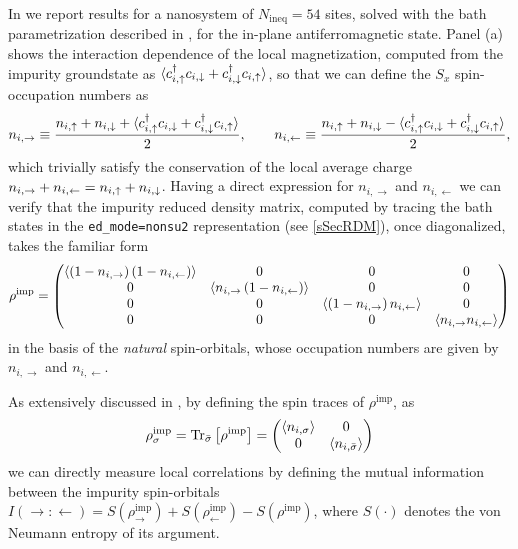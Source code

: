 \documentclass[edipack_sp.tex]{subfiles}
\begin{document}
In  we report results for a nanosystem of 
$N_\mathrm{ineq}=54$ sites, solved with the bath parametrization 
described in , for the in-plane 
antiferromagnetic state.
Panel (a) shows the interaction dependence of the local magnetization,
computed from the impurity groundstate as  
$ \langle c^\dagger_{i,\uparrow} c_{i,\downarrow} + c^\dagger_{i,\downarrow} c_{i,\uparrow} \rangle$,
so that we can define the $S_x$ spin-occupation numbers as
\begin{equation*}
    n_{i,\rightarrow} \equiv \frac{n_{i,\uparrow} + n_{i,\downarrow} +
    \langle c^\dagger_{i,\uparrow} c_{i,\downarrow} + c^\dagger_{i,\downarrow} c_{i,\uparrow} \rangle}{2},
    \qquad
    n_{i,\leftarrow} \equiv \frac{n_{i,\uparrow} + n_{i,\downarrow} -
    \langle c^\dagger_{i,\uparrow} c_{i,\downarrow} + c^\dagger_{i,\downarrow} c_{i,\uparrow} \rangle}{2},
\end{equation*}
which trivially satisfy the conservation of the local average charge $n_{i,\rightarrow} + n_{i,\leftarrow} = n_{i,\uparrow} + n_{i,\downarrow}$.
Having a direct expression for $n_{i,\rightarrow}$ and $n_{i,\leftarrow}$
we can verify that the impurity reduced density matrix, computed by 
tracing the bath states in the \texttt{ed\_mode=nonsu2} representation 
(see \ref{sSecRDM}), once diagonalized, takes the familiar form
\cite{XiDai2013,WalshLetter2019,BellomiaPhD,BellomiaKMH,Bellomia_intracorr} 
\begin{equation}
    \rho^\mathrm{imp} = 
     \begin{pmatrix}
            \left\langle\left(1-n_{i,\rightarrow}\right)\left(1-n_{i,\leftarrow}\right)\right\rangle   &    0          &       0       &   0 \\
                    0       &    \left\langle n_{i,\rightarrow}\left(1-n_{i,\leftarrow}\right)\right\rangle  &       0       &   0 \\
                   0       &       0   &    \left\langle\left(1-n_{i,\rightarrow}\right)n_{i,\leftarrow}\right\rangle      &   0 \\
                    0       &       0   &       0          &    \left\langle n_{i,\rightarrow} n_{i,\leftarrow}\right\rangle
        \end{pmatrix} 
\end{equation}
in the basis of the \emph{natural} spin-orbitals, whose occupation numbers
are given by $n_{i,\rightarrow}$ and $n_{i,\leftarrow}$.

As extensively discussed in \cite{BellomiaPhD,BellomiaKMH,Bellomia_intracorr},
by defining the spin traces of $\rho^\mathrm{imp}$, as
\begin{equation}
    \rho^\mathrm{imp}_\sigma = 
    {\rm Tr}_{\bar{\sigma}} \left[\rho^\mathrm{imp}\right] =
    \begin{pmatrix}
        \langle n_{i,\sigma} \rangle & 0 \\
        0 & \langle n_{i,\bar{\sigma}} \rangle
    \end{pmatrix}
\end{equation}
we can directly measure local correlations by defining the mutual information
between the impurity spin-orbitals
$I(\rightarrow:\leftarrow) = 
    S(\rho^\mathrm{imp}_{\rightarrow}) + 
    S(\rho^\mathrm{imp}_{\leftarrow}) -
    S(\rho^\mathrm{imp})$,
where $S(\cdot)$ denotes the von Neumann entropy of its argument.
\end{document}
